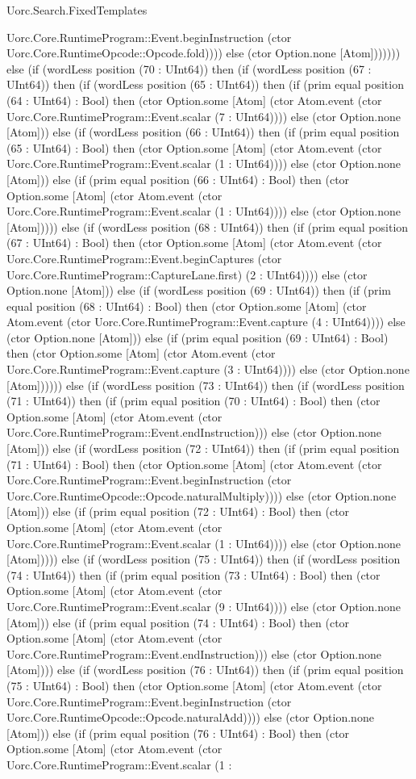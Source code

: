 \begin{lexlean}{Uorc.Search.FixedTemplates}
\begin{semanticmodule}
{Uorc.Core.RuntimeProgram::Event.beginInstruction (ctor Uorc.Core.RuntimeOpcode::Opcode.fold)))) else (ctor Option.none [Atom])))))) else (if (wordLess position (70 : UInt64)) then (if (wordLess position (67 : UInt64)) then (if (wordLess position (65 : UInt64)) then (if (prim equal position (64 : UInt64) : Bool) then (ctor Option.some [Atom] (ctor Atom.event (ctor Uorc.Core.RuntimeProgram::Event.scalar (7 : UInt64)))) else (ctor Option.none [Atom])) else (if (wordLess position (66 : UInt64)) then (if (prim equal position (65 : UInt64) : Bool) then (ctor Option.some [Atom] (ctor Atom.event (ctor Uorc.Core.RuntimeProgram::Event.scalar (1 : UInt64)))) else (ctor Option.none [Atom])) else (if (prim equal position (66 : UInt64) : Bool) then (ctor Option.some [Atom] (ctor Atom.event (ctor Uorc.Core.RuntimeProgram::Event.scalar (1 : UInt64)))) else (ctor Option.none [Atom])))) else (if (wordLess position (68 : UInt64)) then (if (prim equal position (67 : UInt64) : Bool) then (ctor Option.some [Atom] (ctor Atom.event (ctor Uorc.Core.RuntimeProgram::Event.beginCaptures (ctor Uorc.Core.RuntimeProgram::CaptureLane.first) (2 : UInt64)))) else (ctor Option.none [Atom])) else (if (wordLess position (69 : UInt64)) then (if (prim equal position (68 : UInt64) : Bool) then (ctor Option.some [Atom] (ctor Atom.event (ctor Uorc.Core.RuntimeProgram::Event.capture (4 : UInt64)))) else (ctor Option.none [Atom])) else (if (prim equal position (69 : UInt64) : Bool) then (ctor Option.some [Atom] (ctor Atom.event (ctor Uorc.Core.RuntimeProgram::Event.capture (3 : UInt64)))) else (ctor Option.none [Atom]))))) else (if (wordLess position (73 : UInt64)) then (if (wordLess position (71 : UInt64)) then (if (prim equal position (70 : UInt64) : Bool) then (ctor Option.some [Atom] (ctor Atom.event (ctor Uorc.Core.RuntimeProgram::Event.endInstruction))) else (ctor Option.none [Atom])) else (if (wordLess position (72 : UInt64)) then (if (prim equal position (71 : UInt64) : Bool) then (ctor Option.some [Atom] (ctor Atom.event (ctor Uorc.Core.RuntimeProgram::Event.beginInstruction (ctor Uorc.Core.RuntimeOpcode::Opcode.naturalMultiply)))) else (ctor Option.none [Atom])) else (if (prim equal position (72 : UInt64) : Bool) then (ctor Option.some [Atom] (ctor Atom.event (ctor Uorc.Core.RuntimeProgram::Event.scalar (1 : UInt64)))) else (ctor Option.none [Atom])))) else (if (wordLess position (75 : UInt64)) then (if (wordLess position (74 : UInt64)) then (if (prim equal position (73 : UInt64) : Bool) then (ctor Option.some [Atom] (ctor Atom.event (ctor Uorc.Core.RuntimeProgram::Event.scalar (9 : UInt64)))) else (ctor Option.none [Atom])) else (if (prim equal position (74 : UInt64) : Bool) then (ctor Option.some [Atom] (ctor Atom.event (ctor Uorc.Core.RuntimeProgram::Event.endInstruction))) else (ctor Option.none [Atom]))) else (if (wordLess position (76 : UInt64)) then (if (prim equal position (75 : UInt64) : Bool) then (ctor Option.some [Atom] (ctor Atom.event (ctor Uorc.Core.RuntimeProgram::Event.beginInstruction (ctor Uorc.Core.RuntimeOpcode::Opcode.naturalAdd)))) else (ctor Option.none [Atom])) else (if (prim equal position (76 : UInt64) : Bool) then (ctor Option.some [Atom] (ctor Atom.event (ctor Uorc.Core.RuntimeProgram::Event.scalar (1 : }
\end{semanticmodule}
\end{lexlean}
